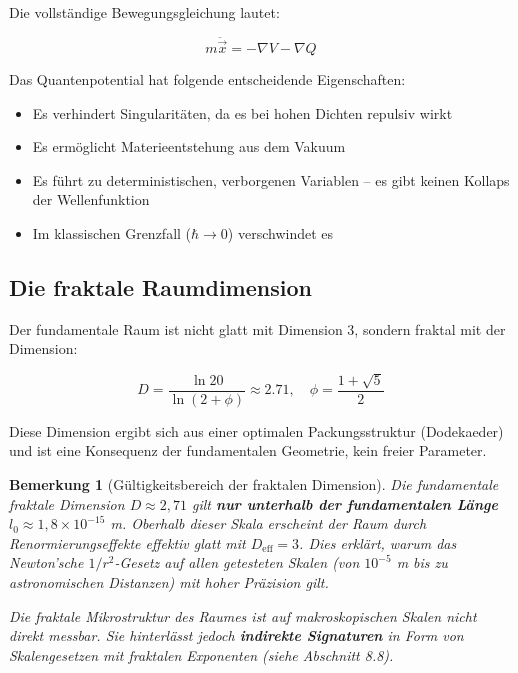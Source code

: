\documentclass[12pt,a4paper]{article}
\newtheorem{remark}{Bemerkung}[section]
\begin{document}
Die vollständige Bewegungsgleichung lautet:

\begin{equation}
m\ddot{\vec{x}} = -\nabla V - \nabla Q
\end{equation}

Das Quantenpotential hat folgende entscheidende Eigenschaften:
\begin{itemize}
\item Es verhindert Singularitäten, da es bei hohen Dichten repulsiv wirkt
\item Es ermöglicht Materieentstehung aus dem Vakuum
\item Es führt zu deterministischen, verborgenen Variablen -- es gibt keinen Kollaps der Wellenfunktion
\item Im klassischen Grenzfall ($\hbar \rightarrow 0$) verschwindet es
\end{itemize}

\subsection{Die fraktale Raumdimension}

Der fundamentale Raum ist nicht glatt mit Dimension 3, sondern fraktal mit der Dimension:

\begin{equation}
D = \frac{\ln 20}{\ln(2 + \phi)} \approx 2.71, \quad \phi = \frac{1 + \sqrt{5}}{2}
\end{equation}

Diese Dimension ergibt sich aus einer optimalen Packungsstruktur (Dodekaeder) und ist eine Konsequenz der fundamentalen Geometrie, kein freier Parameter.

\begin{remark}[Gültigkeitsbereich der fraktalen Dimension]
Die fundamentale fraktale Dimension $D \approx 2,71$ gilt \textbf{nur unterhalb der fundamentalen Länge} $l_0 \approx 1,8 \times 10^{-15}$ m. Oberhalb dieser Skala erscheint der Raum durch Renormierungseffekte effektiv glatt mit $D_{\text{eff}} = 3$. Dies erklärt, warum das Newton'sche $1/r^2$-Gesetz auf allen getesteten Skalen (von $10^{-5}$ m bis zu astronomischen Distanzen) mit hoher Präzision gilt.

Die fraktale Mikrostruktur des Raumes ist auf makroskopischen Skalen nicht direkt messbar. Sie hinterlässt jedoch \textbf{indirekte Signaturen} in Form von Skalengesetzen mit fraktalen Exponenten (siehe Abschnitt 8.8).
\end{remark}
\end{document}
